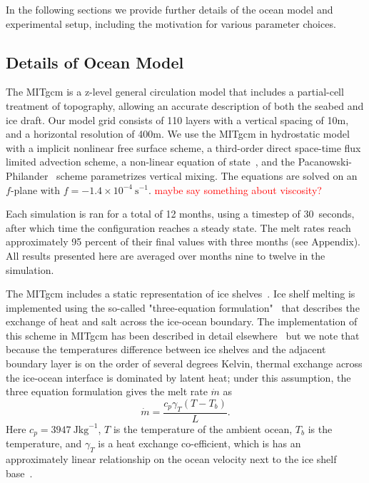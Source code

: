 \documentclass[draft]{agujournal2019}
\newcommand{\red}[1]{\textcolor{red}{#1}}
\begin{document}
In the following sections we provide further details of the ocean model and experimental setup, including the motivation for various parameter choices.

\subsection{Details of Ocean Model}
The MITgcm is a z-level general circulation model that includes a partial-cell treatment of topography, allowing an accurate description of both the seabed and ice draft. Our model grid consists of 110 layers with a vertical spacing of 10m, and a horizontal resolution of 400m. We use the MITgcm in hydrostatic model with a implicit nonlinear free surface scheme, a third-order direct space-time flux limited advection scheme, a non-linear equation of state~, and the Pacanowski-Philander~\cite{Pacanowski1981JPhysOcean} scheme parametrizes vertical mixing. The equations are solved on an $f$-plane with $f = -1.4\times10^{-4}~\text{s}^{-1}$. \red{maybe say something about viscosity?}

Each simulation is ran for a total of 12 months, using a timestep of 30~\si{seconds}, after which time the configuration reaches a steady state. The melt rates reach approximately 95 percent of their final values with three months (see Appendix). All results presented here are averaged over months nine to twelve in the simulation. 

The MITgcm includes a static representation of ice shelves~\cite{Losch2008JGeophysResOceans}. Ice shelf melting is implemented using the so-called "three-equation formulation"~\cite{Holland1999JPhysOcean} that describes the exchange of heat and salt across the ice-ocean boundary. The implementation of this scheme in MITgcm has been described in detail elsewhere~\cite[for example]{DeRydt2014JGeophysResOceans,Dansereau2014JGROceans} but we note that because the temperatures difference between ice shelves and the adjacent boundary layer is on the order of several degrees Kelvin, thermal exchange across the ice-ocean interface is dominated by latent heat; under this assumption, the three equation formulation gives the melt rate $\dot{m}$ as
\begin{equation}
    \dot{m} = \frac{c_p \gamma_T (T - T_b)}{L}.
\end{equation}
Here $c_p = 3947~\si{\joule \kilogram}^{-1}$, $T$ is the temperature of the ambient ocean, $T_b$ is the temperature, and $\gamma_T$ is a heat exchange co-efficient, which is has an approximately linear relationship on the ocean velocity next to the ice shelf base~\cite{Holland1999JPhysOcean}.
\end{document}
